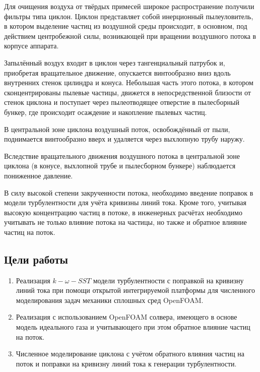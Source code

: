 		Для очищения воздуха от твёрдых примесей широкое распространение получили фильтры типа циклон. Циклон представляет собой инерционный пылеуловитель, в котором выделение частиц из воздушной среды происходит, в основном, под действием центробежной силы, возникающей при вращении воздушного потока в корпусе аппарата.
	
		Запылённый воздух входит в циклон через тангенциальный патрубок и, приобретая вращательное движение, опускается винтообразно вниз вдоль внутренних стенок цилиндра и конуса. Небольшая часть этого потока, в котором сконцентрированы пылевые частицы, движется в непосредственной близости от стенок циклона и поступает через пылеотводящее отверстие в пылесборный бункер, где происходит осаждение и накопление пылевых частиц.
	
		В центральной зоне циклона воздушный поток, освобождённый от пыли, поднимается винтообразно вверх и удаляется через выхлопную трубу наружу.
	
		Вследствие вращательного движения воздушного потока в центральной зоне циклона (в конусе, выхлопной трубе и пылесборном бункере) наблюдается пониженное давление.\cite{instructions}
	
		В силу высокой степени закрученности потока, необходимо введение поправок в модели турбулентности для учёта кривизны линий тока. Кроме того, учитывая высокую концентрацию частиц в потоке, в инженерных расчётах необходимо учитывать не только влияние потока на частицы, но также и обратное влияние частиц на поток.
	\subsection*{Цели работы}
		\begin{enumerate}
			\item Реализация $k-\omega-SST$ модели турбулентности с поправкой на кривизну линий тока при помощи открытой интегрируемой платформы для численного моделирования задач механики сплошных сред OpenFOAM.
			\item Реализация с использованием OpenFOAM солвера, имеющего в основе модель идеального газа и учитывающего при этом обратное влияние частиц на поток.
			\item Численное моделирование циклона с учётом обратного влияния частиц на поток и поправки на кривизну линий тока к генерации турбулентности.
		\end{enumerate}
